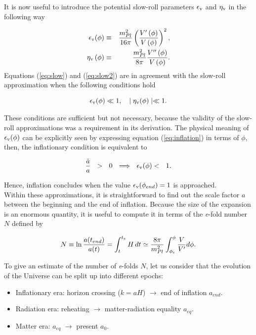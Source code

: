 \documentclass{rmaa}
\def\bea{\begin{eqnarray}}
\def\eea{\end{eqnarray}}
\begin{document}
\vspace{0.5cm}
It is now useful to introduce the potential slow-roll parameters 
$\epsilon_{\rm v}$ and $\eta_{\rm v}$ in the following way \citep{Liddle92}


\bea
\epsilon_{\rm v}(\phi) &\equiv&{m^2_{Pl} \over 16 \pi } \left({V'\left(\phi\right) \over V\left(\phi\right)}\right)^2, 
\label{eq:epsi} \\
\eta_{\rm v}\left(\phi\right) &\equiv& \frac{m^2_{Pl}}{8\pi} {V''\left(\phi\right) \over V\left(\phi\right)} \label{eq:eta}.
\eea
%
Equations (\ref{eq:slow}) and (\ref{eq:slow2}) are in agreement with the slow-roll approximation
when the following conditions hold

\begin{equation*}
\epsilon_{\rm v}(\phi) \ll 1,  \,\,\,\,\,\,  \mid \eta_{\rm v}(\phi)\mid \ll 1.
\end{equation*}

\noindent
These conditions are sufficient but not necessary, because the validity of the slow-roll
approximations was a requirement in its derivation.
%
The physical meaning of $\epsilon_{\rm v}(\phi)$ can be explicitly seen by expressing equation (\ref{eq:inflation})
 in terms of $\phi$, then, the inflationary condition is equivalent to
 
 \begin{equation}
 {\ddot a \over a} ~~ > ~~ 0 ~~ \Longrightarrow ~~ \epsilon_{\rm v}(\phi) < ~~  1.
\end{equation}

\noindent
Hence, inflation concludes when the value $\epsilon_{\rm v} (\phi_{end})= 1$ is approached.
\\

Within these approximations, it is straightforward to find out the scale factor $a$ between
the beginning and the end of inflation. Because the size of the expansion is 
an enormous quantity, it is useful to compute it in terms of the 
 {\it e}-fold number $N$ defined by 
 
\begin{equation} \label{eq:N}
N \equiv \ln {a(t_{end}) \over a(t)}=
\int_{t}^{t_e}{H\,dt} \simeq 
{8\pi \over m^2_{Pl}} \int_{\phi_e}^{\phi} {V \over V'} d\phi .
\end{equation}

\noindent
To give an estimate of the number of \textit{e}-folds $N$, let us consider that the evolution of the Universe 
can be split up into different epochs:

\begin{itemize}
\item Inflationary era: horizon crossing ($k=aH$) $\to$ end of inflation $a_{end}$.
\item Radiation era: reheating $\to$ matter-radiation equality $a_{eq}$.
\item Matter era: $a_{eq}$ $\to$ present $a_{0}$.
\end{itemize}
\end{document}
